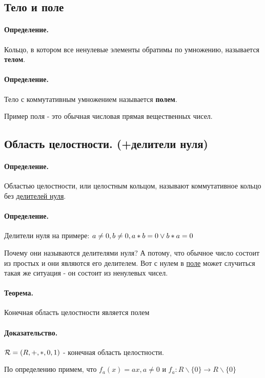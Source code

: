 \documentclass{report}
\begin{document}
\subsection{Тело и поле}
\paragraph*{Определение.}
Кольцо, в котором все ненулевые элементы обратимы по умножению, называется \textbf{телом}.

\paragraph*{Определение.} Тело с коммутативным умножением называется \textbf{полем}.


Пример поля - это обычная числовая прямая вещественных чисел.

\subsection{Область целостности. (+делители нуля)}
\paragraph*{Определение.}
Областью целостности, или целостным кольцом, называют коммутативное кольцо без \underline{делителей нуля}.

\paragraph*{Определение.}
Делители нуля на примере: $a \neq 0, b \neq 0,\newline
    a*b=0 \lor b*a=0$

Почему они называются делителями нуля? А потому, что обычное число состоит
из простых и они являются его делителем. Вот с нулем в \underline{поле}
может случиться такая же ситуация - он состоит из ненулевых чисел.

\paragraph*{Теорема.}
Конечная область целостности является полем
\paragraph*{Доказательство.}
${\cal R} = (R, +, *, 0, 1)$ - конечная область целостности.

По определению примем, что $f_a(x) = ax, a\neq 0 $ и $f_a: R\backslash\{0\} \to R\backslash\{0\}$
\end{document}
